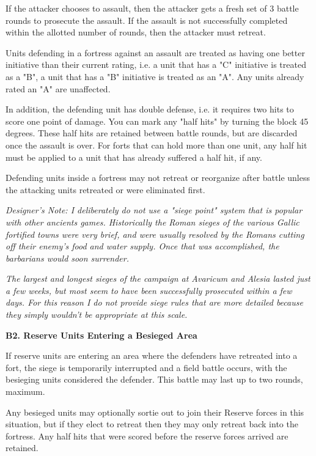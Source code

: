 If the attacker chooses to assault, then the attacker gets a fresh set of 3 battle rounds to prosecute the assault. If the assault is not successfully completed within the allotted number of rounds, then the attacker must retreat.

Units defending in a fortress against an assault are treated as having one better initiative than their current rating, i.e. a unit that has a "C" initiative is treated as a "B", a unit that has a "B" initiative is treated as an "A". Any units already rated an "A" are unaffected.

In addition, the defending unit has double defense, i.e. it requires two hits to score one point of damage. You can mark any "half hits" by turning the block 45 degrees. These half hits are retained between battle rounds, but are discarded once the assault is over. For forts that can hold more than one unit, any half hit must be applied to a unit that has already suffered a half hit, if any.

Defending units inside a fortress may not retreat or reorganize after battle unless the attacking units retreated or were eliminated first.

\textit{Designer's Note: I deliberately do not use a "siege point" system that is popular with other ancients games. Historically the Roman sieges of the various Gallic fortified towns were very brief, and were usually resolved by the Romans cutting off their enemy's food and water supply. Once that was accomplished, the barbarians would soon surrender.}

\textit{The largest and longest sieges of the campaign at Avaricum and Alesia lasted just a few weeks, but most seem to have been successfully prosecuted within a few days. For this reason I do not provide siege rules that are more detailed because they simply wouldn't be appropriate at this scale.}

\textbf{B2. Reserve Units Entering a Besieged Area}

If reserve units are entering an area where the defenders have retreated into a fort, the siege is temporarily interrupted and a field battle occurs, with the besieging units considered the defender. This battle may last up to two rounds, maximum.

Any besieged units may optionally sortie out to join their Reserve forces in this situation, but if they elect to retreat then they may only retreat back into the fortress. Any half hits that were scored before the reserve forces arrived are retained.

